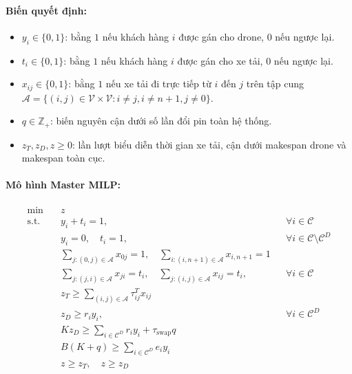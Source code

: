 \documentclass[12pt,a4paper]{article}
\newcommand{\C}{\mathcal{C}}
\newcommand{\CD}{\mathcal{C}^{D}}
\newcommand{\A}{\mathcal{A}}
\newcommand{\V}{\mathcal{V}}
\newcommand{\swap}{\tau_{\mathrm{swap}}}
\begin{document}
\paragraph{Biến quyết định:}
\begin{itemize}[leftmargin=2em]
    \item $y_i \in \{0, 1\}$: bằng $1$ nếu khách hàng $i$ được gán cho drone, $0$ nếu ngược lại.
    \item $t_i \in \{0, 1\}$: bằng $1$ nếu khách hàng $i$ được gán cho xe tải, $0$ nếu ngược lại.
    \item $x_{ij} \in \{0, 1\}$: bằng $1$ nếu xe tải đi trực tiếp từ $i$ đến $j$ trên tập cung $\A = \{(i,j) \in \V \times \V: i \neq j, i \neq n+1, j \neq 0\}$.
    \item $q \in \mathbb{Z}_+$: biến nguyên cận dưới số lần đổi pin toàn hệ thống.
    \item $z_T, z_D, z \ge 0$: lần lượt biểu diễn thời gian xe tải, cận dưới makespan drone và makespan toàn cục.
\end{itemize}

\paragraph{Mô hình Master MILP:}
\begin{align}
    \min \quad & z \label{eq:master-obj}\\
    \text{s.t.} \quad & y_i + t_i = 1, && \forall i \in \C \label{eq:master-assign}\\
    & y_i = 0, \quad t_i = 1, && \forall i \in \C \setminus \CD \label{eq:master-drone-infeasible}\\
    & \sum_{j:(0,j)\in \A} x_{0j} = 1, \quad \sum_{i:(i,n+1)\in \A} x_{i,n+1} = 1 \label{eq:master-depot-deg}\\
    & \sum_{j:(j,i)\in \A} x_{ji} = t_i, \quad \sum_{j:(i,j)\in \A} x_{ij} = t_i, && \forall i \in \C \label{eq:master-cust-deg}\\
    & z_T \ge \sum_{(i,j)\in \A} \tau^T_{ij} x_{ij} \label{eq:master-zt}\\
    & z_D \ge r_i y_i, && \forall i \in \CD \label{eq:master-zd-single}\\
    & K z_D \ge \sum_{i \in \CD} r_i y_i + \swap q \label{eq:master-zd-workload}\\
    & B(K + q) \ge \sum_{i \in \CD} e_i y_i \label{eq:master-zd-energy}\\
    & z \ge z_T, \quad z \ge z_D \label{eq:master-z-link}
\end{align}
\end{document}
